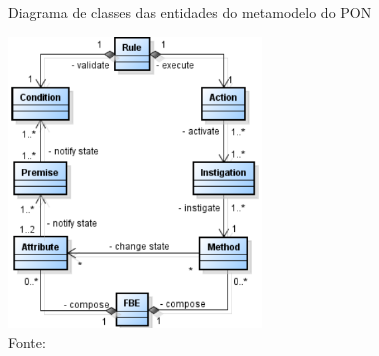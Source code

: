 \begin{figure}[!htb]
  \centering
  \caption{Diagrama de classes das entidades do metamodelo do PON}
  \includegraphics[width=0.6\textwidth]{../figures/metamodelo_pon.png}
  \caption*{Fonte: }
  \label{fig:nop_class}
\end{figure}

